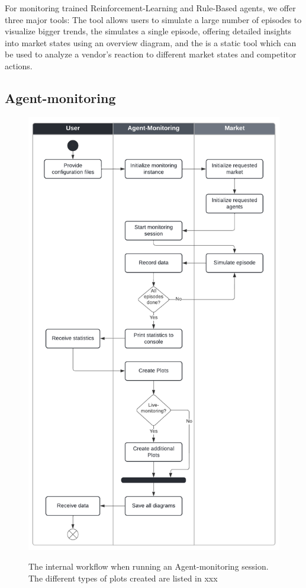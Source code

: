 For monitoring trained Reinforcement-Learning and Rule-Based agents, we offer three major tools: The  tool allows users to simulate a large number of episodes to visualize bigger trends, the  simulates a single episode, offering detailed insights into market states using an overview diagram, and the  is a static tool which can be used to analyze a vendor's reaction to different market states and competitor actions.

\subsection*{Agent-monitoring}\label{subsec:AgentMonitoring}

\begin{figure}
	\centering
	\includegraphics[width = \textwidth]{images/swimlane_monitoring.pdf}\\
	\caption{The internal workflow when running an Agent-monitoring session. The different types of plots created are listed in xxx}\label{fig:SwimlaneMonitoring}
\end{figure}

